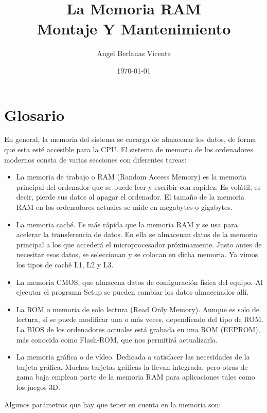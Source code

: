 \documentclass[11pt]{article}
\author{Angel Berlanas Vicente}
\date{\today}
\title{La Memoria RAM\\\medskip
\large Montaje Y Mantenimiento}
\begin{document}
\maketitle
\tableofcontents


\section{Glosario}
\label{sec:org99c87e5}

En general, la memoria del sistema se encarga de almacenar los datos, de forma que
esta esté accesible para la CPU. El sistema de memoria de los ordenadores modernos
consta de varias secciones con diferentes tareas:

\begin{itemize}
\item La memoria de trabajo o RAM (Random Access Memory) es la memoria principal
del  ordenador que se puede leer y escribir con rapidez. Es volátil, es
decir, pierde sus  datos al apagar el ordenador. El tamaño de la memoria RAM
en los ordenadores actuales se mide en megabytes o gigabytes.
\item La memoria caché. Es más rápida que la memoria RAM y se usa para acelerar la
transferencia de datos. En ella se almacenan datos de la memoria principal a
los que accederá el microprocesador próximamente. Justo antes de necesitar
esos datos, se seleccionan y se colocan en dicha memoria. Ya vimos los tipos de caché L1, L2 y L3.
\item La memoria CMOS, que almacena datos de configuración física del equipo. Al ejecutar el programa Setup se pueden cambiar los datos almacenados allí.
\item La ROM o memoria de solo lectura (Read Only Memory). Aunque es solo de
lectura, sí se puede modificar una o más veces, dependiendo del tipo de
ROM. La BIOS de los ordenadores actuales está grabada en una ROM (EEPROM),
más conocida como Flash-ROM, que nos permitirá actualizarla.
\item La memoria gráfica o de vídeo. Dedicada a satisfacer las necesidades de la
tarjeta gráfica. Muchas tarjetas gráficas la llevan integrada, pero otras de
gama baja emplean parte de la memoria RAM para aplicaciones tales como los juegos 3D.
\end{itemize}

Algunos parámetros que hay que tener en cuenta en la memoria son:
\end{document}
